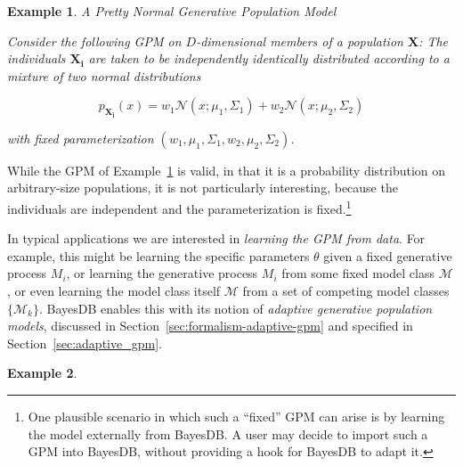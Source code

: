 \documentclass[10pt,letterpaper]{article}
\newtheorem{example}{Example}[section]
\newcommand{\set}[1]{\{#1\}}
\begin{document}
\begin{example} \label{ex:normal_gpm} A Pretty Normal Generative Population
Model

Consider the following GPM on $D$-dimensional members of
a population $\mathbf{X}$: The individuals $\mathbf{X_i}$ are taken to
be independently identically distributed according to a mixture of two
normal distributions

\[ p_\mathbf{X_i}(x) = w_1\mathcal{N}(x;\mu_1,\Sigma_1) +
 w_2\mathcal{N}(x;\mu_2,\Sigma_2) \]

with fixed parameterization $(w_1, \mu_1, \Sigma_1, w_2, \mu_2, \Sigma_2)$.
\end{example}

While the GPM of Example~\ref{ex:normal_gpm} is valid, in that it is a
probability distribution on arbitrary-size populations, it is not
particularly interesting, because the individuals are independent and
the parameterization is fixed.\footnote{One plausible scenario in
  which such a ``fixed'' GPM can arise is by learning the model
  externally from BayesDB.  A user may decide to import such a GPM
  into BayesDB, without providing a hook for BayesDB to adapt it.}


In typical applications we are interested in \textit{learning the GPM
  from data}. For example, this might be learning the specific
parameters $\theta$ given a fixed generative process $M_i$, or
learning the generative process $M_i$ from some fixed model class
$\mathcal{M}$, or even learning the model class itself $\mathcal{M}$
from a set of competing model classes $\set{\mathcal{M}_k}$.  BayesDB
enables this with its notion of \emph{adaptive generative population
  models}, discussed in Section~\ref{sec:formalism-adaptive-gpm} and
specified in Section~\ref{sec:adaptive_gpm}.

\begin{example}
\end{example}
\end{document}
